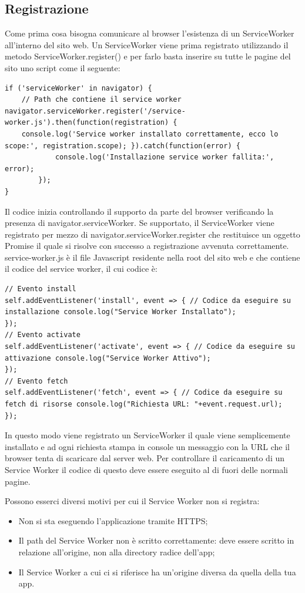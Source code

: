 \documentclass[11pt ,a4paper , twoside , openright ]{article}
\begin{document}
\subsection{Registrazione}

Come prima cosa bisogna comunicare al browser l’esistenza di un ServiceWorker all’interno del sito web. Un ServiceWorker viene prima registrato utilizzando il metodo ServiceWorker.register() e per farlo basta inserire su tutte le pagine del sito uno script come il seguente:
\begin{lstlisting}
if ('serviceWorker' in navigator) { 
	// Path che contiene il service worker navigator.serviceWorker.register('/service-worker.js').then(function(registration) { 			 		
	console.log('Service worker installato correttamente, ecco lo scope:', registration.scope); }).catch(function(error) { 
			console.log('Installazione service worker fallita:', error); 
		});
}
\end{lstlisting}
Il codice inizia controllando il supporto da parte del browser verificando la presenza di navigator.serviceWorker. Se supportato, il ServiceWorker viene registrato per mezzo di navigator.serviceWorker.register che restituisce un oggetto Promise il quale si risolve con successo a registrazione avvenuta correttamente.
service-worker.js è il file Javascript residente nella root del sito web e che contiene il codice del service worker, il cui codice è:
\begin{lstlisting}
// Evento install
self.addEventListener('install', event => { // Codice da eseguire su installazione console.log("Service Worker Installato");
});
// Evento activate
self.addEventListener('activate', event => { // Codice da eseguire su attivazione console.log("Service Worker Attivo");
});
// Evento fetch
self.addEventListener('fetch', event => { // Codice da eseguire su fetch di risorse console.log("Richiesta URL: "+event.request.url);
});
\end{lstlisting}

In questo modo viene registrato un ServiceWorker il quale viene semplicemente installato e ad ogni richiesta stampa in console un messaggio con la URL che il browser tenta di scaricare dal server web. Per controllare il caricamento di un Service Worker il codice di questo deve essere eseguito al di fuori delle normali pagine.

Possono esserci diversi motivi per cui il Service Worker non si registra:
\begin{itemize}
	\item Non si sta eseguendo l'applicazione tramite HTTPS;
	\item Il path del Service Worker non è scritto correttamente: deve essere scritto in relazione all'origine, non alla directory radice dell'app;
	\item Il Service Worker a cui ci si riferisce ha un'origine diversa da quella della tua app.
\end{itemize}
\end{document}
